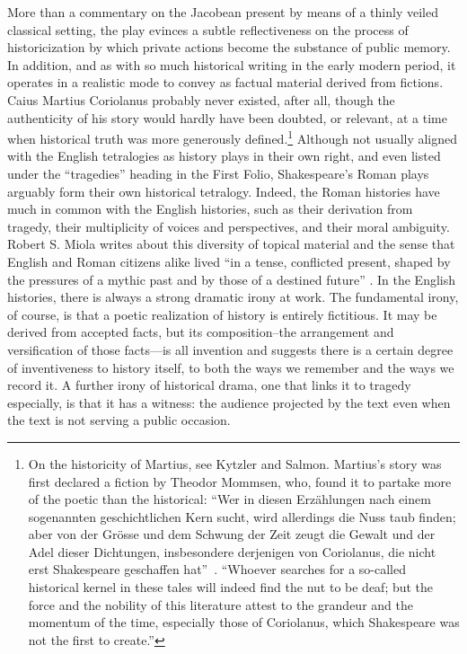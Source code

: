 More than a commentary on the Jacobean present by means of a thinly veiled classical setting, the play evinces a subtle reflectiveness on the process of historicization by which private actions become the substance of public memory.
In addition, and as with so much historical writing in the early modern period, it operates in a realistic mode to convey as factual material derived from fictions.
Caius Martius Coriolanus probably never existed, after all, though the authenticity of his story would hardly have been doubted, or relevant, at a time when historical truth was more generously defined.\footnote{On the historicity of Martius, see Kytzler and Salmon.
Martius's story was first declared a fiction by Theodor Mommsen, who, found it to partake more of the poetic than the historical: ``Wer in diesen Erzählungen nach einem sogenannten geschichtlichen Kern sucht, wird allerdings die Nuss taub finden; aber von der Grösse und dem Schwung der Zeit zeugt die Gewalt und der Adel dieser Dichtungen, insbesondere derjenigen von Coriolanus, die nicht erst Shakespeare geschaffen hat''~\cite[26]{mommsen_erzahlung_1870}.
``Whoever searches for a so-called historical kernel in these tales will indeed find the nut to be deaf; but the force and the nobility of this literature attest to the grandeur and the momentum of the time, especially those of Coriolanus, which Shakespeare was not the first to create.''} 
Although not usually aligned with the English tetralogies as history plays in their own right, and even listed under the ``tragedies'' heading in the First Folio, Shakespeare's Roman plays arguably form their own historical tetralogy.
Indeed, the Roman histories have much in common with the English histories, such as their derivation from tragedy, their multiplicity of voices and perspectives, and their moral ambiguity.
Robert S. Miola writes about this diversity of topical material and the sense that English and Roman citizens alike lived ``in a tense, conflicted present, shaped by the pressures of a mythic past and by those of a destined future''
\cite[193]{miola_shakespeares_2002}.
In the English histories, there is always a strong dramatic irony at work.
The fundamental irony, of course, is that a poetic realization of history is entirely fictitious.
It may be derived from accepted facts, but its composition--the arrangement and versification of those facts---is all invention and suggests there is a certain degree of inventiveness to history itself, to both the ways we remember and the ways we record it.
A further irony of historical drama, one that links it to tragedy especially, is that it has a witness: the audience projected by the text even when the text is not serving a public occasion.
